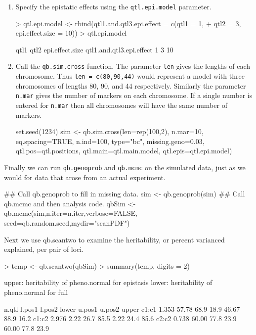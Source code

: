 \documentclass[12pt]{article}
\begin{document}
\begin{enumerate}
\begin{Schunk}
\end{Schunk}
\item Specify the epistatic effects using the {\tt qtl.epi.model} 
parameter.
\begin{Schunk}
\begin{Sinput}
> qtl.epi.model <- rbind(qtl1.and.qtl3.epi.effect = c(qtl1 = 1, 
+     qtl2 = 3, epi.effect.size = 10))
> qtl.epi.model
\end{Sinput}
\begin{Soutput}
                         qtl1 qtl2 epi.effect.size
qtl1.and.qtl3.epi.effect    1    3              10
\end{Soutput}
\end{Schunk}
\item  Call the {\tt qb.sim.cross} function.   The parameter {\tt len} 
gives the lengths of each chromosome. Thus \texttt{len = c(80,90,44)} 
would represent a model with three  chromosomes of lengths 80, 90, and 
44 respectively.    Similarly the parameter {\tt n.mar} gives the 
number of markers on each chromosome.  If a single number is entered 
for {\tt n.mar} then all chromosomes will have the same number of 
markers.
\begin{Schunk}
\begin{Sinput}
set.seed(1234)
sim <- qb.sim.cross(len=rep(100,2), n.mar=10, eq.spacing=TRUE, 
  n.ind=100, type="bc", missing.geno=0.03, qtl.pos=qtl.positions, 
  qtl.main=qtl.main.model, qtl.epis=qtl.epi.model)
\end{Sinput}
\end{Schunk}
\end{enumerate}
Finally we can run {\tt qb.genoprob} and {\tt qb.mcmc} on the 
simulated data, just as we would for  data that arose from an actual 
experiment. 
\begin{Schunk}
\begin{Sinput}
## Call qb.genoprob to fill in missing data.
sim <- qb.genoprob(sim)
## Call qb.mcmc and then analysis code.
qbSim <- qb.mcmc(sim,n.iter=n.iter,verbose=FALSE,
                    seed=qb.random.seed,mydir="scanPDF")
\end{Sinput}
\end{Schunk}
Next we use qb.scantwo to examine the heritability, or percent
varianced explained, per pair of loci.
\begin{Schunk}
\begin{Sinput}
> temp <- qb.scantwo(qbSim)
> summary(temp, digits = 2)
\end{Sinput}
\begin{Soutput}
upper: heritability of pheno.normal for epistasis
lower: heritability of pheno.normal for full 

      n.qtl l.pos1 l.pos2 lower u.pos1 u.pos2 upper
c1:c1 1.353  57.78   68.9  18.9  46.67   88.9  16.2
c1:c2 2.976   2.22   26.7  85.5   2.22   24.4  85.6
c2:c2 0.738  60.00   77.8  23.9  60.00   77.8  23.9
\end{Soutput}
\end{Schunk}
\end{document}
